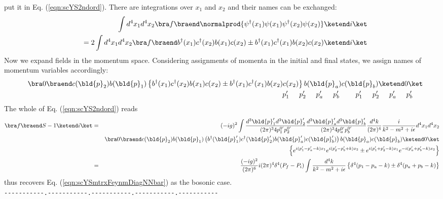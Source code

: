 {put it in Eq. (\ref{eqn:scYS2ndord}). There are integrations over $x_1$ and $x_2$
and their names can be exchanged:
\begin{eqnarray}
&&\int d^4x_1 d^4x_2
\bra f \braend
\normalprod{\psi^\dagger(x_1) \psi(x_1) \psi^\dagger (x_2) \psi(x_2)}
\ketend i \ket
\nonumber\\
&&=
2 \int d^4x_1 d^4x_2
\bra f \braend
b^\dagger(x_1) c^\dagger(x_2) b(x_1) c(x_2) 
\pm
b^\dagger(x_1) c^\dagger(x_1) b(x_2) c(x_2)
\ketend i \ket
\nonumber
\end{eqnarray}
Now we expand fields in the momentum space.
Considering assignments of momenta in the initial and final states,
we assign names of momentum variables accordingly:
\begin{eqnarray}
&&
\bra 0 \braend
c(\bld{p}_2) b(\bld{p}_1)
\left\{
b^\dagger(x_1) c^\dagger(x_2) b(x_1) c(x_2) 
\pm
b^\dagger(x_1) c^\dagger(x_1) b(x_2) c(x_2)
\right\}
b(\bld{p}_a) c(\bld{p}_b) 
\ketend 0 \ket
\nonumber\\
&&
\hspace{25mm}
p_1'
\hspace{5mm}
p_2'
\hspace{5mm}
p_a'
\hspace{5mm}
p_b'
\hspace{8mm}
p_1'
\hspace{5mm}
p_2'
\hspace{5mm}
p_a'
\hspace{5mm}
p_b'
\hspace{5mm}
\nonumber
\end{eqnarray}
The whole of Eq. (\ref{eqn:scYS2ndord}) reads
\begin{eqnarray}
\bra f \braend S - 1 \ketend i \ket
&=&
(-ig)^2 \int
\frac{d^3 \bld{p}_1' d^3 \bld{p}_2'}{(2\pi)^3 4p_1^{0'}p_2^{0'}}
\frac{d^3 \bld{p}_a' d^3 \bld{p}_b'}{(2\pi)^3 4p_a^{0'}p_b^{0'}}
\frac{d^4 k}{(2\pi)^4} \frac{i}{k^2 - m^2 + i\epsilon}
d^4x_1 d^4x_2
\nonumber\\
&&
\bra 0 \braend
c(\bld{p}_2) b(\bld{p}_1)
\left(
b^\dagger(\bld{p}_1') c^\dagger(\bld{p}_2') b(\bld{p}_a') c(\bld{p}_b')
\right)
b(\bld{p}_a) c(\bld{p}_b) 
\ketend 0 \ket
\nonumber\\
&&
\left\{
e^{i(p_1' - p_a' - k)x_1} e^{i(p_2' - p_b' + k)x_2} 
\pm
e^{i(p_1' + p_2' - k)x_1} e^{-i(p_a' + p_b' - k)x_2} 
\right\}
\nonumber\\
&=&
\frac{(-ig)^2}{(2\pi)^6} i (2\pi)^4 \delta^4(P_f - P_i)
\int
\frac{d^4 k}{k^2 - m^2 + i\epsilon}
\left\{
\delta^4 (p_1 - p_a - k)
\pm
\delta^4 (p_a + p_b - k)
\right\}
\nonumber
\end{eqnarray}
thus recovers Eq. (\ref{eqn:scYSmtrxFeynmDiagNNbar})
as the bosonic case.
}\\
\verb/-----------.-----------.-----------.-----------.-----------/\\

